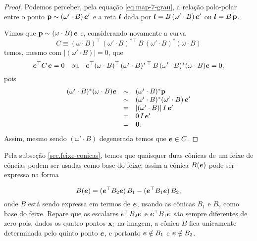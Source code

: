 \begin{proof}
 Podemos perceber, pela equação \ref{eq.map-7-grau}, a relação polo-polar entre o ponto ${\bf p}\sim (\omega'\cdot B)\,\boldsymbol{e}'$ e a reta $\boldsymbol{l}$ dada por $\boldsymbol{l}=B\,(\omega'\cdot B)\,\boldsymbol{e}'$ ou $\boldsymbol{l}=B\,{\bf p}$.
 
 
Vimos que ${\bf p}\sim (\omega\cdot B)\,\boldsymbol{e}$ e, considerando novamente a curva 
\begin{equation*}
C \equiv (\omega \cdot B)^\top\,(\omega' \cdot B)^{*\,\top}\,B\,(\omega' \cdot B)^*(\omega \cdot B)
\end{equation*}                                      
temos, mesmo com  $|(\omega' \cdot B)|=0$, que
\begin{equation*}
\boldsymbol{e}^\top C\,\boldsymbol{e}=0\quad\text{ou}\quad
\boldsymbol{e}^\top (\omega \cdot B)^\top\,(\omega' \cdot B)^{*\,\top}\,B\,(\omega' \cdot B)^*(\omega \cdot B)\boldsymbol{e}=0,
\end{equation*}                                                pois
\begin{equation*}
\begin{array}{rcl}
(\omega' \cdot B)^*(\omega \cdot B)\boldsymbol{e}&\sim &(\omega' \cdot B)^*{\bf p}\\
&\sim &(\omega' \cdot B)^*(\omega'\cdot B)\,\boldsymbol{e}'\\
&=&|(\omega' \cdot B)|\,I\,\boldsymbol{e}'\\
&=&0\,I\,\boldsymbol{e}'\\
&=&{\bf 0}.
\end{array}
\end{equation*}
Assim, mesmo sendo $(\omega' \cdot B)$ degenerada temos que $\boldsymbol{e}\in C$.                                   
\end{proof}

Pela subseção \ref{sec.feixe-conicas}, temos que quaisquer duas cônicas de um feixe de côncias podem ser usadas como base do feixe, assim a cônica $B(\boldsymbol{e})$ pode ser expressa na forma

\begin{equation*}
B(\boldsymbol{e})=(\boldsymbol{e}^\top B_2\boldsymbol{e})\,B_1-(\boldsymbol{e}^\top B_1\boldsymbol{e})\,B_2,
\end{equation*} 
onde $B$ está sendo expressa em termos de $\boldsymbol{e}$, usando as cônicas $B_1$ e $B_2$ como base do feixe. Repare que os escalares $\boldsymbol{e}^\top B_2\boldsymbol{e}$ e $\boldsymbol{e}^\top B_1\boldsymbol{e}$ são sempre diferentes de zero pois, dados os quatro pontos $\mathbf{x}_i$ na imagem, a cônica $B$ fica unicamente determinada pelo quinto ponto $\boldsymbol{e}$, e portanto $\boldsymbol{e}\notin B_1$ e $\boldsymbol{e}\notin B_2$.


